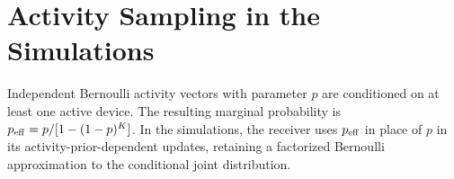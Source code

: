 \section{Activity Sampling in the Simulations}
\label{app:activity-sampling}

Independent Bernoulli activity vectors with parameter $p$ are
conditioned on at least one active device. The resulting marginal
probability is $p_{\rm eff}=p/[1-(1-p)^K]$.
In the simulations, the receiver uses $p_{\rm eff}$ in place of $p$
in its activity-prior-dependent updates, retaining a factorized
Bernoulli approximation to the conditional joint distribution.
